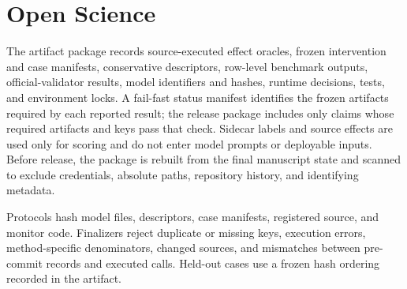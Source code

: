 \section{Open Science}
\label{app:open-science}

The artifact package records source-executed effect oracles, frozen intervention
and case manifests, conservative descriptors, row-level benchmark outputs,
official-validator results, model identifiers and hashes, runtime decisions,
tests, and environment locks.  A fail-fast status manifest identifies the
frozen artifacts required by each reported result; the release package includes
only claims whose required artifacts and keys pass that check.  Sidecar labels
and source effects are used only for scoring and do not enter model prompts or
deployable inputs.  Before release, the package is rebuilt from the final
manuscript state and scanned to exclude credentials, absolute paths, repository
history, and identifying metadata.

Protocols hash model files, descriptors, case manifests, registered source, and
monitor code.  Finalizers reject duplicate or missing keys, execution errors,
method-specific denominators, changed sources, and mismatches between
pre-commit records and executed calls.  Held-out cases use a frozen hash
ordering recorded in the artifact.
